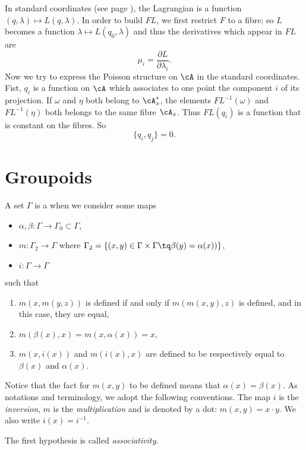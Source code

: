 In standard coordinates (see page \pageref{PgStandCoord}), the Lagrangian is a function $(q,\lambda)\mapsto L(q,\lambda)$. In order to build $FL$, we first restrict $F$ to a fibre; so $L$ becomes a function $\lambda\mapsto L(q_{0},\lambda)$ and thus the derivatives which appear in $FL$ are 
\[ 
  \mu_{i}=\frac{ \partial L }{ \partial\lambda_{i} }.
\]
Now we try to express the Poisson structure on $\cA$ in the standard coordinates. Fist, $q_{i}$ is a  function on $\cA$ which associates to one point the component $i$ of its projection. If $\omega$ and $\eta$ both belong to $\cA^*_{x}$, the elements $FL^{-1}(\omega)$ and $FL^{-1}(\eta)$ both belongs to the same fibre $\cA_{x}$. Thus $FL(q_{i})$ is a function that is constant on the fibres. So
\[ 
  \{ q_{i},q_{j} \}=0.
\]





%
   \section{Groupoids}
%

A set $\Gamma$ is a  when we consider some maps
\begin{itemize}
\item $\alpha,\beta\colon \Gamma\to \Gamma_{0}\subset\Gamma$,
 \item $m\colon \Gamma_{2}\to \Gamma$ where $\Gamma_{2}=\{ (x,y)\in\Gamma\times\Gamma\tq \beta(y)=\alpha(x)) \}$,
\item $i\colon \Gamma\to \Gamma$
\end{itemize}
such that
\begin{enumerate}
\item $m(x,m(y,z))$ is defined if and only if $m(m(x,y),z)$ is defined, and in this case, they are equal,
\item $m(\beta(x),x)=m(x,\alpha(x))=x$,
  \item $m(x,i(x))$ and $m(i(x),x)$ are defined to be respectively equal to $\beta(x)$ and $\alpha(x)$.
\end{enumerate}
Notice that the fact for $m(x,y)$ to be defined means that $\alpha(x)=\beta(x)$. As notations and terminology, we adopt the following conventions. The map $i$ is the \emph{inversion}, $m$ is the \emph{multiplication} and is denoted by a dot: $m(x,y)=x\cdot y$. We also write $i(x)=i^{-1}$. 

The first hypothesis is called \emph{associativity}.


